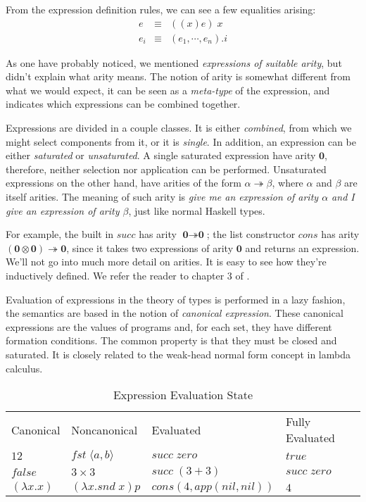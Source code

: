 From the expression definition rules, we can see a few equalities arising:
\begin{eqnarray*}
  e & \equiv & ((x)e)\;x \\
  e_i & \equiv & (e_1, \cdots, e_n).i
\end{eqnarray*}

As one have probably noticed, we mentioned \emph{expressions of suitable arity}, but didn't explain
what arity means. The notion of arity is somewhat different from what we would expect, it can
be seen as a \emph{meta-type} of the expression, and indicates which expressions can be combined
together.

\newcommand{\arzero}{\textbf{0}}
\newcommand{\ararr}{\twoheadrightarrow}
\newcommand{\armul}{\otimes}

Expressions are divided in a couple classes. It is either \emph{combined}, from which we
might select components from it, or it is \emph{single}. In addition, an expression
can be either \emph{saturated} or \emph{unsaturated}. A single saturated expression
have arity $\arzero$, therefore, neither selection nor application can be performed.
Unsaturated expressions on the other hand, have arities of the form $\alpha \ararr \beta$,
where $\alpha$ and $\beta$ are itself arities. The meaning of such arity is \emph{give me an expression
of arity $\alpha$ and I give an expression of arity $\beta$}, just like normal Haskell types. 

For example, the built in $succ$ has arity $\arzero \ararr \arzero$; the list constructor
$cons$ has arity $(\arzero \armul \arzero) \ararr \arzero$, since it takes two expressions
of arity $\arzero$ and returns an expression. We'll not go into much more detail 
on arities. It is easy to see how they're inductively defined. We refer the reader
to chapter 3 of \cite{nords90}.

Evaluation of expressions in the theory of types is performed in a lazy fashion, the semantics
are based in the notion of \emph{canonical expression}. These canonical expressions are the values
of programs and, for each set, they have different formation conditions. The common property is
that they must be closed and saturated. It is closely related to the weak-head normal form concept in
lambda calculus.  

\begin{center}
\begin{table}[h]
\begin{tabular}{p{3cm} p{3cm} p{3cm} p{3cm}}
  Canonical & Noncanonical & Evaluated & Fully Evaluated \\  
  $12$ & $fst\;\langle a , b \rangle$ & $succ\;zero$ & $true$ \\
  $false$ & $3 \times 3$ & $succ\;(3 + 3)$ & $succ\;zero$ \\
  $(\lambda x . x)$ & $(\lambda x . snd\;x) p$ & $cons(4, app(nil, nil))$ & $4$
\end{tabular}
\caption{Expression Evaluation State}
\end{table}
\end{center}

